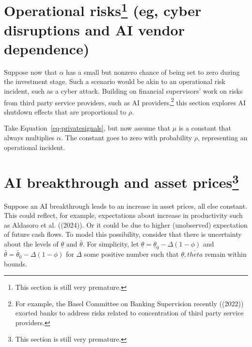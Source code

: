 \documentclass[
]{article}
\theoremstyle{plain}
\theoremstyle{definition}
\theoremstyle{remark}
\begin{document}
\hypertarget{operational-riskswipoprisk-eg-cyber-disruptions-and-ai-vendor-dependence}{%
\section[Operational risks (eg, cyber disruptions and AI vendor
dependence)]{\texorpdfstring{Operational risks\footnote{This section is
  still very premature.} (eg, cyber disruptions and AI vendor
dependence)}{Operational risks (eg, cyber disruptions and AI vendor dependence)}}\label{operational-riskswipoprisk-eg-cyber-disruptions-and-ai-vendor-dependence}}

Suppose now that \(\alpha\) has a small but nonzero chance of being set
to zero during the investment stage. Such a scenario would be akin to an
operational risk incident, such as a cyber attack. Building on financial
supervisors' work on risks from third party service providers, such as
AI providers,\footnote{For example, the Basel Committee on Banking
  Supervision recently ((2022)) exorted banks to address risks related
  to concentration of third party service providers.} this section
explores AI shutdown effects that are proportional to \(\rho\).

Take Equation~\ref{eq-privatesignals}, but now assume that \(\mu\) is a
constant that always multiplies \(\alpha\). The constant goes to zero
with probability \(\rho\), representing an operational incident.

\hypertarget{ai-breakthrough-and-asset-priceswipasset}{%
\section[AI breakthrough and asset prices]{\texorpdfstring{AI
breakthrough and asset
prices\footnote{This section is still very premature.}}{AI breakthrough and asset prices}}\label{ai-breakthrough-and-asset-priceswipasset}}

Suppose an AI breakthrough leads to an increase in asset prices, all
else constant. This could reflect, for example, expectations about
increase in productivity such as Aldasoro et al. ((2024)). Or it could
be due to higher (unobserved) expectation of future cash flows. To model
this possibility, consider that there is uncertainty about the levels of
\(\underline{\theta}\) and \(\bar{\theta}\). For simplicity, let
\(\underline{\theta} = \underline{\theta}_0 - \Delta(1-\phi)\) and
\(\bar{\theta} = \bar{\theta}_0 - \Delta(1-\phi)\) for \(\Delta\) some
positive number such that \(\underline{\theta}, \bar{theta}\) remain
within bounds.
\end{document}
